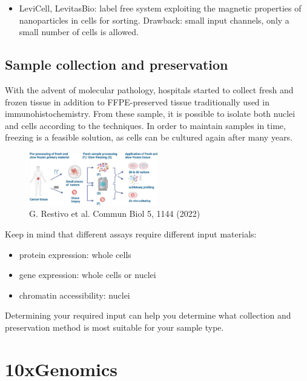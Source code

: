 \begin{itemize}
\tightlist
\item
  LeviCell, LevitasBio: label free system exploiting the magnetic
  properties of nanoparticles in cells for sorting. Drawback: small
  input channels, only a small number of cells is allowed.
\end{itemize}

\hypertarget{sample-collection-and-preservation}{%
\subsection{Sample collection and
preservation}\label{sample-collection-and-preservation}}

With the advent of molecular pathology, hospitals started to collect
fresh and frozen tissue in addition to FFPE-preserved tissue
traditionally used in immunohistochemistry. From these sample, it is
possible to isolate both nuclei and cells according to the techniques.
In order to maintain samples in time, freezing is a feasible solution,
as cells can be cultured again after many years.

\begin{figure}
\centering
\includegraphics[width=0.5\textwidth]{images/Screenshot_3.png}
\caption{G. Restivo et al. Commun Biol 5, 1144 (2022)}
\end{figure}

Keep in mind that different assays require different input materials:

\begin{itemize}
\tightlist
\item
  protein expression: whole cells
\item
  gene expression: whole cells or nuclei
\item
  chromatin accessibility: nuclei
\end{itemize}

Determining your required input can help you determine what collection
and preservation method is most suitable for your sample type.

\hypertarget{xgenomics}{%
\section{10xGenomics}\label{xgenomics}}

